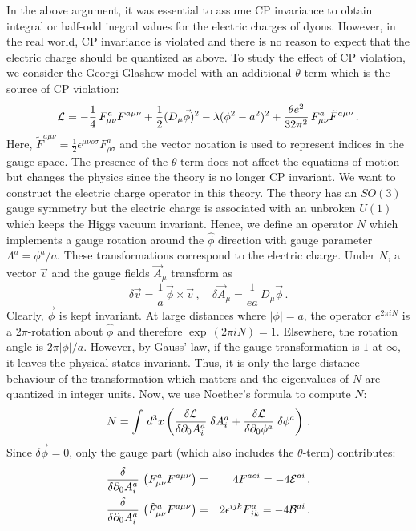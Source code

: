 In the above argument, it was essential to assume CP invariance to
obtain integral or half-odd inegral values for the electric charges of
dyons. However, in the real world, CP invariance is violated and there
is no reason to expect that the electric charge should be quantized as
above. To study the effect of CP violation, we consider the
Georgi-Glashow model with an additional $\theta$-term which is the
source of CP violation:
\begin{equation}
{\cal L}=-\frac{1}{4}\,F^a_{\mu\nu}F^{a\mu\nu}+\frac{1}{2}
(D_{\mu} \vec{\phi})^{2} - \lambda (\phi^{2} - a^{2} )^{2}
+\frac{\theta e^2}{32\pi^2}\,F^a_{\mu\nu}\tilde F^{a\mu\nu}\,. 
\label{LXXVIII}
\end{equation}
Here, $\tilde F^{a\mu\nu}=\frac{1}{2}\epsilon^{\mu\nu\rho\sigma} 
F^a_{\rho\sigma}$ and the vector notation is used to represent indices
in the gauge space. The presence of the $\theta$-term does not affect
the equations of motion but changes the physics since the theory is no
longer CP invariant. We want to construct the electric charge operator
in this theory. The theory has an $SO(3)$ gauge symmetry but the
electric charge is associated with an unbroken $U(1)$ which keeps the
Higgs vacuum invariant. Hence, we define an operator $N$ which
implements a gauge rotation around the $\hat{\phi}$ direction with
gauge parameter $\Lambda^a = \phi^a/a$. These transformations
correspond to the electric charge. Under $N$, a vector $\vec v $ and
the gauge fields $\vec A_\mu$ transform as    
$$
\delta \vec{v} = \frac{1}{a} \, \vec{\phi} \times \vec{v}\,, \quad
\delta \vec{A}_{\mu} = \frac{1}{ea} \, D_{\mu} \vec{\phi}\,.
$$
Clearly, $\vec{\phi}$ is kept invariant. At large distances where
$|\phi|=a$, the operator $e^{2\pi i N}$ is a $2 \pi$-rotation about
$\hat{\phi}$ and therefore $\exp\,(2\pi iN)=1$. Elsewhere, the
rotation angle is $2\pi |\phi|/a$. However, by Gauss' law, if the
gauge transformation is $1$ at $\infty$, it leaves the physical states
invariant. Thus, it is only the large distance behaviour of the
transformation which matters and the eigenvalues of $N$ are quantized
in integer units. Now, we use Noether's formula to compute $N$: 
$$
N=\int\,d^3x\left(\frac{\delta{\cal L}}{\delta\partial_0 A^a_i}\;
\delta A_{i}^{a} + \frac{\delta {\cal L}}{\delta \partial_{0}
\phi^{a}} \; \delta \phi^{a} \right )\,.
$$
Since $\delta \vec\phi= 0$, only the gauge part (which also includes
the $\theta$-term) contributes:
\begin{eqnarray}
\frac{\delta}{\delta \partial_{0}A^{a}_{i}} \,
\left ( F^{a}_{\mu \nu} F^{a\mu\nu}\right) &=&
4F^{aoi} = -4 {\cal E}^{ai}\,, \nonumber\\
\frac{\delta}{\delta \partial_{0}A^{a}_{i}} \,
\left(\tilde{F}^a_{\mu\nu}F^{a\mu\nu}\right) &=&
2\epsilon^{ijk}F^a_{jk} =-4 {\cal B}^{ai}\,. \nonumber
\end{eqnarray}
